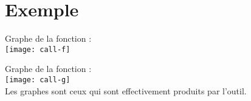 \section{Exemple}

\begin{exemple}


\end{exemple}

Graphe de la fonction : \\

\texttt{[image: call-f]}
\\

\clearpage

Graphe de la fonction : \\

\texttt{[image: call-g]}
\\

Les graphes sont ceux qui sont effectivement produits par l'outil.
